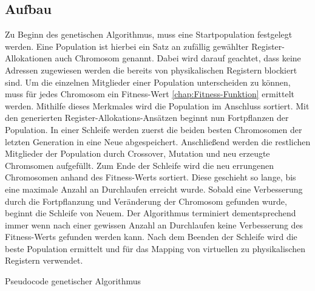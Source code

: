  
\subsection{Aufbau}
\label{chap:aufbau}
Zu Beginn des genetischen Algorithmus, muss eine Startpopulation festgelegt werden. Eine Population ist hierbei ein Satz an zufällig gewählter Register-Allokationen auch Chromosom genannt. Dabei wird darauf geachtet, dass keine Adressen zugewiesen werden die bereits von physikalischen Registern blockiert sind.
Um die einzelnen Mitglieder einer Population unterscheiden zu können, muss für jedes Chromosom ein Fitness-Wert \ref{chap:Fitness-Funktion} ermittelt werden. Mithilfe dieses Merkmales wird die Population im Anschluss sortiert. 
Mit den generierten Register-Allokations-Ansätzen beginnt nun Fortpflanzen der Population. In einer Schleife werden zuerst die beiden besten Chromosomen der letzten Generation in eine Neue abgespeichert. Anschließend werden die restlichen Mitglieder der Population durch Crossover, Mutation und neu erzeugte Chromsomen aufgefüllt. Zum Ende der Schleife wird die neu errungenen Chromosomen anhand des Fitness-Werts sortiert. Diese geschieht so lange, bis eine maximale Anzahl an Durchlaufen erreicht wurde. Sobald eine Verbesserung durch die Fortpflanzung und Veränderung der Chromosom gefunden wurde, beginnt die Schleife von Neuem. Der Algorithmus terminiert dementsprechend immer wenn nach einer gewissen Anzahl an Durchlaufen keine Verbesserung des Fitness-Werts gefunden werden kann. Nach dem Beenden der Schleife wird die beste Population ermittelt und für das Mapping von virtuellen zu physikalischen Registern verwendet.

\begin{algorithm}[H]
	\begin{algorithmic}[1]
%		
		
		 				
		 
	 	\ENDFOR
		\ENDFOR
		\ELSE
		\ENDIF
	\ENDWHILE
	\caption{Pseudocode genetischer Algorithmus}
\end{algorithmic}
\end{algorithm}


